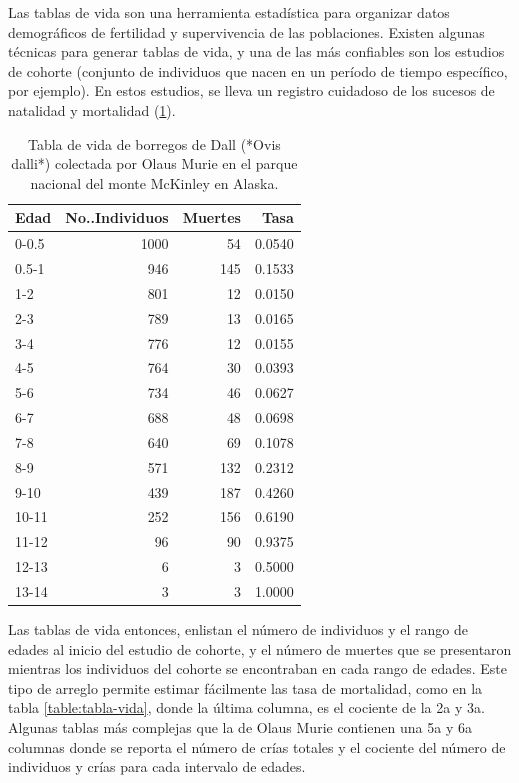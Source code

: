 \documentclass[
]{book}
\begin{document}
Las tablas de vida son una herramienta estadística para organizar datos demográficos de fertilidad y supervivencia de las poblaciones. Existen algunas técnicas para generar tablas de vida, y una de las más confiables son los estudios de cohorte (conjunto de individuos que nacen en un período de tiempo específico, por ejemplo). En estos estudios, se lleva un registro cuidadoso de los sucesos de natalidad y mortalidad (\ref{tab:tabla-vida}).

\begin{table}

\caption{\label{tab:tabla-vida}Tabla de vida de borregos de Dall (*Ovis dalli*) colectada por Olaus Murie en el parque nacional del monte McKinley en Alaska.}
\centering
\begin{tabular}[t]{l|r|r|r}
\hline
Edad & No..Individuos & Muertes & Tasa\\
\hline
0-0.5 & 1000 & 54 & 0.0540\\
\hline
0.5-1 & 946 & 145 & 0.1533\\
\hline
1-2 & 801 & 12 & 0.0150\\
\hline
2-3 & 789 & 13 & 0.0165\\
\hline
3-4 & 776 & 12 & 0.0155\\
\hline
4-5 & 764 & 30 & 0.0393\\
\hline
5-6 & 734 & 46 & 0.0627\\
\hline
6-7 & 688 & 48 & 0.0698\\
\hline
7-8 & 640 & 69 & 0.1078\\
\hline
8-9 & 571 & 132 & 0.2312\\
\hline
9-10 & 439 & 187 & 0.4260\\
\hline
10-11 & 252 & 156 & 0.6190\\
\hline
11-12 & 96 & 90 & 0.9375\\
\hline
12-13 & 6 & 3 & 0.5000\\
\hline
13-14 & 3 & 3 & 1.0000\\
\hline
\end{tabular}
\end{table}

Las tablas de vida entonces, enlistan el número de individuos y el rango de edades al inicio del estudio de cohorte, y el número de muertes que se presentaron mientras los individuos del cohorte se encontraban en cada rango de edades. Este tipo de arreglo permite estimar fácilmente las tasa de mortalidad, como en la tabla \ref{table:tabla-vida}, donde la última columna, es el cociente de la 2a y 3a. Algunas tablas más complejas que la de Olaus Murie contienen una 5a y 6a columnas donde se reporta el número de crías totales y el cociente del número de individuos y crías para cada intervalo de edades.
\end{document}
